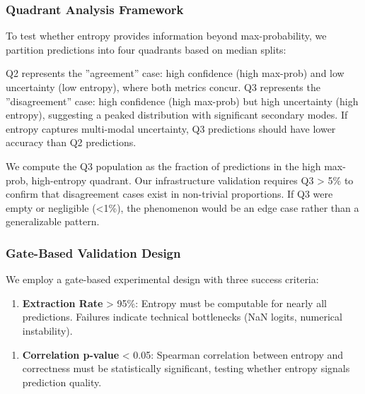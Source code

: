 \subsubsection{Quadrant Analysis Framework}

To test whether entropy provides information beyond max-probability, we partition predictions into four quadrants based on median splits:

\begin{table}[htbp]
\centering
{}
\end{table}

Q2 represents the ''agreement'' case: high confidence (high max-prob) and low uncertainty (low entropy), where both metrics concur. Q3 represents the ''disagreement'' case: high confidence (high max-prob) but high uncertainty (high entropy), suggesting a peaked distribution with significant secondary modes. If entropy captures multi-modal uncertainty, Q3 predictions should have lower accuracy than Q2 predictions.

We compute the Q3 population as the fraction of predictions in the high max-prob, high-entropy quadrant. Our infrastructure validation requires Q3 > 5\% to confirm that disagreement cases exist in non-trivial proportions. If Q3 were empty or negligible (<1\%), the phenomenon would be an edge case rather than a generalizable pattern.

\subsubsection{Gate-Based Validation Design}

We employ a gate-based experimental design with three success criteria:

\begin{enumerate}
\item \textbf{Extraction Rate} > 95\%: Entropy must be computable for nearly all predictions. Failures indicate technical bottlenecks (NaN logits, numerical instability).
\end{enumerate}

\begin{enumerate}
\item \textbf{Correlation p-value} < 0.05: Spearman correlation between entropy and correctness must be statistically significant, testing whether entropy signals prediction quality.
\end{enumerate}


